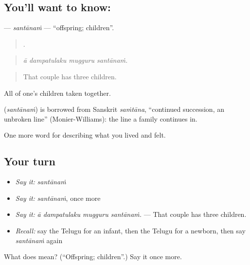 \subsection*{You'll want to know: }
\textbf{} — \emph{santānaṁ} — \textquotedblleft{}offspring; children\textquotedblright{}.

\begin{quote}
   .
\end{quote}

\begin{quote}
\emph{ā dampatulaku mugguru santānaṁ.}
\end{quote}

\begin{quote}
That couple has three children.
\end{quote}

All of one's children taken together.

\begin{cousinweb}
\textbf{} (\emph{santānaṁ}) is borrowed from Sanskrit \emph{saṁtāna}, \textquotedblleft{}continued succession, an unbroken line\textquotedblright{} (Monier-Williams): the line a family continues in.
\end{cousinweb}

\begin{grammarlens}[title={What you've built}]
One more word for describing what you lived and felt.
\end{grammarlens}

\subsection*{Your turn}
\begin{itemize}
\raggedright
  \item \emph{Say it:} \emph{santānaṁ}
  \item \emph{Say it:} \emph{santānaṁ}, once more
  \item \emph{Say it:} \emph{ā dampatulaku mugguru santānaṁ.} — That couple has three children.
  \item \emph{Recall:} say the Telugu for an infant, then the Telugu for a newborn, then say \emph{santānaṁ} again
\end{itemize}

\begin{tcolorbox}[breakable,colback=teal!4,colframe=teal!35!black,title={Before you move on}]
What does  mean? (\textquotedblleft{}Offspring; children\textquotedblright{}.) Say it once more.
\end{tcolorbox}
